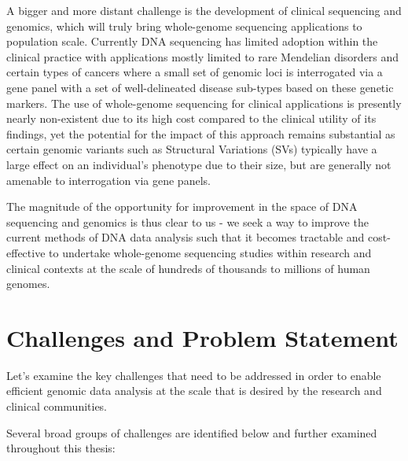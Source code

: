 A bigger and more distant challenge is the development of clinical sequencing and genomics, which will truly bring whole-genome sequencing applications to population scale. Currently DNA sequencing has limited adoption within the clinical practice with applications mostly limited to rare Mendelian disorders\autocite{lee2014clinical} and certain types of cancers\autocite{robinson2015integrative} where a small set of genomic loci is interrogated via a gene panel\autocite{allegra2009american} with a set of well-delineated disease sub-types based on these genetic markers. The use of whole-genome sequencing for clinical applications is presently nearly non-existent due to its high cost compared to the clinical utility of its findings, yet the potential for the impact of this approach remains substantial as certain genomic variants such as Structural Variations (SVs) typically have a large effect on an individual's phenotype due to their size\autocite{pleasance2010comprehensive}, but are generally not amenable to interrogation via gene panels.

The magnitude of the opportunity for improvement in the space of DNA sequencing and genomics is thus clear to us - we seek a way to improve the current methods of DNA data analysis such that it becomes tractable and cost-effective to undertake whole-genome sequencing studies within research and clinical contexts at the scale of hundreds of thousands to millions of human genomes.        

\section{Challenges and Problem Statement}
\label{sec:challenges}

Let's examine the key challenges that need to be addressed in order to enable efficient genomic data analysis at the scale that is desired by the research and clinical communities.

Several broad groups of challenges are identified below and further examined throughout this thesis:

